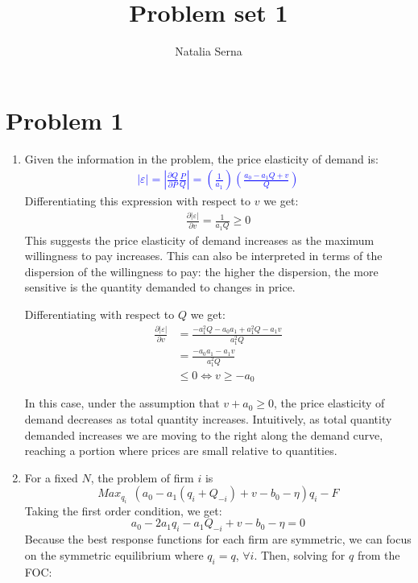 \documentclass[11pt,english]{article}
\author{
Natalia Serna
   }
\title{Problem set 1}
\date{}
\begin{document}
\maketitle

\section{Problem 1}

\begin{enumerate}
\item Given the information in the problem, the price elasticity of demand is:
\textcolor{blue}{\begin{align}
|\varepsilon|=\left|\frac{\partial Q}{\partial P}\frac{P}{Q}\right|=\left(\frac{1}{a_{1}}\right)\left(\frac{a_{0}-a_{1}Q+v}{Q}\right)\nonumber
\end{align}}
Differentiating this expression with respect to $v$ we get:
\begin{align}
\frac{\partial|\varepsilon|}{\partial v}=\frac{1}{a_{1}Q}\geq0\nonumber
\end{align}
This suggests the price elasticity of demand increases as the maximum willingness to pay increases. This can also be interpreted in terms of the dispersion of the willingness to pay: the higher the dispersion, the more sensitive is the quantity demanded to changes in price.

Differentiating with respect to $Q$ we get:
\begin{align}
\frac{\partial|\varepsilon|}{\partial v}&=\frac{-a_{1}^{2}Q-a_{0}a_{1}+a_{1}^{2}Q-a_{1}v}{a_{1}^{2}Q}\nonumber\\
&=\frac{-a_{0}a_{1}-a_{1}v}{a_{1}^{2}Q}\nonumber\\
&\leq0 \iff v\geq -a_{0}\nonumber
\end{align}

In this case, under the assumption that $v+a_{0}\geq0$, the price elasticity of demand decreases as total quantity increases. Intuitively, as total quantity demanded increases we are moving to the right along the demand curve, reaching a portion where prices are small relative to quantities.

\item For a fixed $N$, the problem of firm $i$ is
\[
Max_{q_{i}} \ \ (a_{0}-a_{1}(q_{i}+Q_{-i})+v-b_{0}-\eta)q_{i}-F
\]
Taking the first order condition, we get:
\[
a_{0}-2a_{1}q_{i}-a_{1}Q_{-i}+v-b_{0}-\eta=0
\]
Because the best response functions for each firm are symmetric, we can focus on the symmetric equilibrium where $q_{i}=q$, $\forall i$. Then, solving for $q$ from the FOC:


\end{enumerate}
\end{document}

